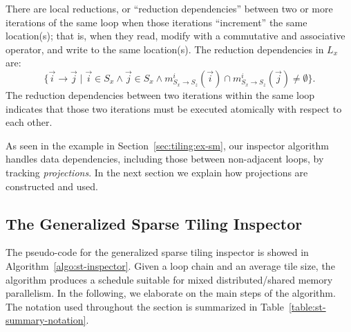 There are local reductions, or ``reduction dependencies'' between two or more iterations of the same loop when those iterations ``increment'' the same location(s); that is, when they read, modify with a commutative and associative operator, and write to the same location(s). The reduction dependencies in $L_x$ are:
\[
	\{ \vec{i} \rightarrow \vec{j} \; | \; \vec{i} \in S_x \wedge \vec{j} \in S_x \wedge m_{S_x\rightarrow S_z}^{i}(\vec{i}) \cap m_{S_x \rightarrow S_z}^{i}(\vec{j}) \ne \emptyset \}.
\]
The reduction dependencies between two iterations within the same loop indicates that those two iterations must be executed atomically with respect to each other.

As seen in the example in Section~\ref{sec:tiling:ex-sm}, our inspector algorithm handles data dependencies, including those between non-adjacent loops, by tracking \textit{projections}. In the next section we explain how projections are constructed and used.



\subsection{The Generalized Sparse Tiling Inspector}
\label{sec:tiling:inspector}

The pseudo-code for the generalized sparse tiling inspector is showed in Algorithm~\ref{algo:st-inspector}. Given a loop chain and an average tile size, the algorithm produces a schedule suitable for mixed distributed/shared memory parallelism. In the following, we elaborate on the main steps of the algorithm. The notation used throughout the section is summarized in Table~\ref{table:st-summary-notation}.

